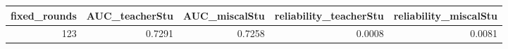 \begin{tabular}{rrrrr}
\toprule
fixed_rounds & AUC_teacherStu & AUC_miscalStu & reliability_teacherStu & reliability_miscalStu \\
\midrule
123 & 0.7291 & 0.7258 & 0.0008 & 0.0081 \\
\bottomrule
\end{tabular}
